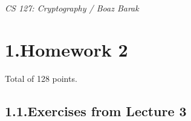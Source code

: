 \documentclass{article}
\begin{document}
\newcommand{\zo}{\{0,1\}}
\newcommand{\getsr}{\leftarrow_{\text{\tiny R}}}
\newcommand{\E}{\mathbb{E}}
\newcommand{\N}{\mathbb{N}}
\noindent{}\emph{CS 127: Cryptography / Boaz Barak}%

\section{1.\hspace*{0.5em}Homework 2}\label{sec-homework-2}%

\noindent{}Total of 128 points.%

\subsection{1.1.\hspace*{0.5em}Exercises from Lecture 3}\label{sec-exercises-from-lecture-3}%
\end{document}
